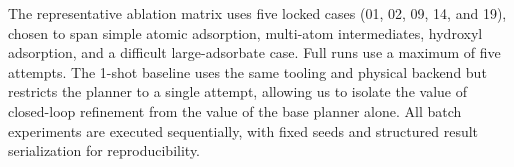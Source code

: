 The representative ablation matrix uses five locked cases (01, 02, 09, 14, and 19), chosen to span simple atomic adsorption, multi-atom intermediates, hydroxyl adsorption, and a difficult large-adsorbate case. Full runs use a maximum of five attempts. The 1-shot baseline uses the same tooling and physical backend but restricts the planner to a single attempt, allowing us to isolate the value of closed-loop refinement from the value of the base planner alone. All batch experiments are executed sequentially, with fixed seeds and structured result serialization for reproducibility.

